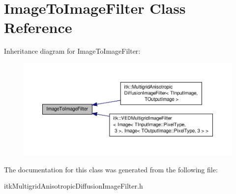 \hypertarget{class_image_to_image_filter}{\section{Image\-To\-Image\-Filter Class Reference}
\label{class_image_to_image_filter}
}


Inheritance diagram for Image\-To\-Image\-Filter\-:
\nopagebreak
\begin{figure}[H]
\begin{center}
\leavevmode
\includegraphics[width=350pt]{class_image_to_image_filter__inherit__graph}
\end{center}
\end{figure}


The documentation for this class was generated from the following file\-:\begin{DoxyCompactItemize}
\item 
itk\-Multigrid\-Anisotropic\-Diffusion\-Image\-Filter.\-h\end{DoxyCompactItemize}
